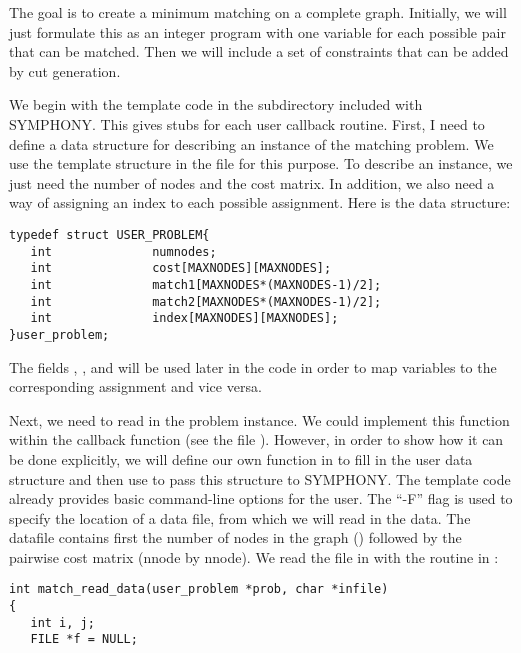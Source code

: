 {The goal is to create a minimum matching on a complete graph. Initially, we
will just formulate this as an integer program with one variable for each
possible pair that can be matched. Then we will include a set of constraints
that can be added by cut generation.

We begin with the template code in the  subdirectory included with
SYMPHONY. This gives stubs for each user callback routine. First, I need to
define a data structure for describing an instance of the matching problem. We
use the template structure  in the file
 for this purpose.  To describe an instance, we just
need the number of nodes and the cost matrix. In addition, we also need a way
of assigning an index to each possible assignment. Here is the data
structure: 
{\color{Brown}
\begin{verbatim}
typedef struct USER_PROBLEM{
   int              numnodes;
   int              cost[MAXNODES][MAXNODES];
   int              match1[MAXNODES*(MAXNODES-1)/2];
   int              match2[MAXNODES*(MAXNODES-1)/2]; 
   int              index[MAXNODES][MAXNODES];
}user_problem;
\end{verbatim}
}
The fields , , and
 will be used later in the code in order to map variables to the
corresponding assignment and vice versa. 

Next, we need to read in the problem instance. We could implement this
function within the  callback function (see the file
). However, in order to show how it can be done
explicitly, we will define our own function  in
 to fill in the user data structure and then use
 to pass this structure to SYMPHONY. The
template code already provides basic command-line options for the user. The
``-F'' flag is used to specify the location of a data file, from which we will
read in the data. The datafile contains first the number of nodes in the graph
() followed by the pairwise cost matrix (nnode by nnode). We
read the file in with the  routine in
:


{\color{Brown}
\begin{verbatim}
int match_read_data(user_problem *prob, char *infile)
{
   int i, j;
   FILE *f = NULL;


\end{verbatim}}}
